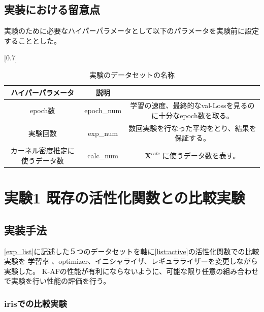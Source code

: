 \subsection{実装における留意点}
実験のために必要なハイパーパラメータとして以下のパラメータを実験前に設定することとした。

\begin{table}[htbp]
    \begin{center}
        \caption{実験のデータセットの名称}
        \vspace{5mm} 
        \scalebox{0.7}[0.7]{
            \begin{tabular}{||c | c |c||}
            ハイパーパラメータ & 説明 \\
            \hline
            epoch数                           & epoch\_num      & 学習の速度、最終的なval-Lossを見るのに十分なepoch数を取る。  \\
            実験回数                           & exp\_num     & 数回実験を行なった平均をとり、結果を保証する。 \\
            カーネル密度推定に使うデータ数        & calc\_num           & $ \mathbf{X}^{calc} $ に使うデータ数を表す。  \\
            \end{tabular}
        }
    \end{center}
\end{table}





\vspace{-15mm} 

\section{実験1 既存の活性化関数との比較実験}
\label{exp1}
\subsection{実装手法}

\ref{exp_list}に記述した５つのデータセットを軸に\ref{list:active}の活性化関数での比較実験を
学習率 、optimizer、イニシャライザ、レギュラライザーを変更しながら実験した。
K-AFの性能が有利にならないように、可能な限り任意の組み合わせで実験を行い性能の評価を行う。

\subsubsection{irisでの比較実験}
\label{impl:iris}

